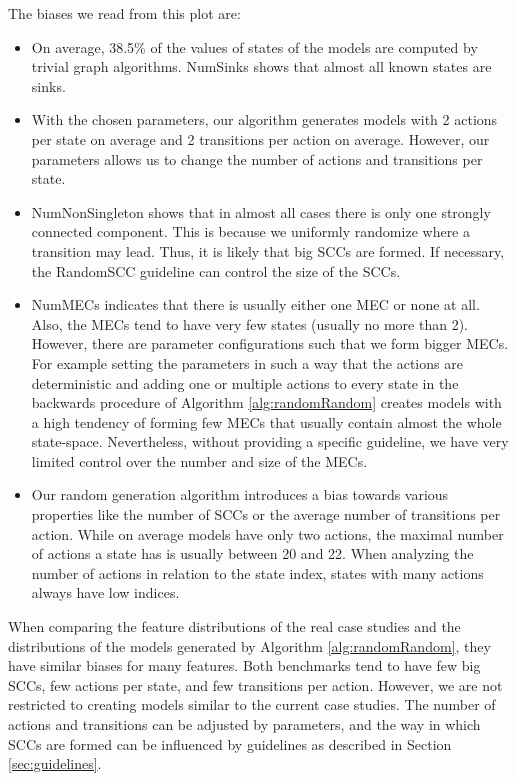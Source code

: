The biases we read from this plot are:
\begin{itemize} \label{insights:randomRandom}
    \item On average, 38.5\% of the values of states of the models are computed by trivial graph algorithms. NumSinks shows that almost all known states are sinks.
    \item With the chosen parameters, our algorithm generates models with 2 actions per state on average
     and 2 transitions per action on average.     
     However, our parameters allows us to change the number of actions and transitions per state.
    \item NumNonSingleton shows that in almost all cases there is only one strongly connected component.
        This is because we uniformly randomize where a transition may lead. Thus, it is likely that big SCCs are formed. 
        If necessary, the RandomSCC guideline can control the size of the SCCs.
    \item NumMECs indicates that there is usually either one MEC or none at all. Also, the MECs tend to have very few states (usually no more than 2).
    However, there are parameter configurations such that we form bigger MECs. For example setting the parameters in such a way that the actions are deterministic
    and adding one or multiple actions to every state in the backwards procedure of Algorithm \ref{alg:randomRandom} creates models with a high tendency of forming few MECs that usually contain almost the whole state-space.
    Nevertheless, without providing a specific guideline, we have very limited control over the number and size of the MECs.
    \item Our random generation algorithm introduces a bias towards various properties like the number of SCCs or the average number of transitions per action.
    While on average models have only two actions, the maximal number of actions a state has is usually between 20 and 22.
    When analyzing the number of actions in relation to the state index, states with many actions always have low indices.
\end{itemize}

When comparing the feature distributions of the real case studies and the distributions of the models generated by Algorithm \ref{alg:randomRandom},
they have similar biases for many features. Both benchmarks tend to have few big SCCs, few actions per state, and few transitions per action.
However, we are not restricted to creating models similar to the current case studies. The number of actions and transitions can be adjusted by parameters,
and the way in which SCCs are formed can be influenced by guidelines as described in Section \ref{sec:guidelines}.

